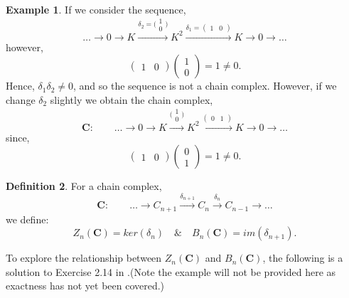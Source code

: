 \documentclass[11.5pt, twoside, a4paper, titlepage]{report}
\providecommand{\equ}[0]{\begin{equation*}}
\providecommand{\eequ}[0] {\end{equation*}}
\theoremstyle{definition}
\newtheorem{mydef}{Definition}[section]
\newtheorem{eg}[mydef]{Example}
\theoremstyle{plain}
\begin{document}
\begin{eg} \label{Kchaineg}
If we consider the sequence, 
\equ 
\dots \xrightarrow{} 0 \xrightarrow{} K \xrightarrow{\delta_2=\big(\begin{smallmatrix} 1\\ 0 \end{smallmatrix}\big)} K^2 \xrightarrow{\delta_1=(\begin{smallmatrix}1 & 0 \end{smallmatrix})} K \xrightarrow{} 0 \xrightarrow{} \dots
\eequ
however,
\equ
\begin{pmatrix}
1 & 0
\end{pmatrix}
\begin{pmatrix*}
1\\
0
\end{pmatrix*}
= 1 \neq 0.
\eequ
Hence, $\delta_1\delta_2 \neq0$, and so the sequence is not a chain complex. However, if we change $\delta_2$ slightly we obtain the chain complex,
\equ
\mathbf{C}: \qquad \dots \xrightarrow{} 0 \xrightarrow{} K \xrightarrow{\big(\begin{smallmatrix} 1\\ 0 \end{smallmatrix}\big)} K^2 \xrightarrow{(\begin{smallmatrix}0 & 1 \end{smallmatrix})} K \xrightarrow{} 0 \xrightarrow{} \dots
\eequ
since, 
\equ
\begin{pmatrix}
1 & 0
\end{pmatrix}
\begin{pmatrix*}
0\\
1
\end{pmatrix*}
= 1 \neq 0.
\eequ
\end{eg}

\begin{mydef}
For a chain complex,
\begin{equation*}
\mathbf{C}: \qquad \dots \xrightarrow{} C_{n+1} \xrightarrow{\delta_{n+1 }} C_{n} \xrightarrow{\delta_{n}} C_{n-1} \xrightarrow{} \dots
\end{equation*}
we define:
\begin{equation*}
Z_n(\mathbf{C})=ker(\delta_n) \quad \& \quad B_n(\mathbf{C})=im(\delta_{n+1}).
\end{equation*}
\end{mydef}

To explore the relationship between $Z_n(\mathbf{C})$ and $B_n(\mathbf{C})$, the following is a solution to Exercise 2.14 in \cite{Rotman}.(Note the example will not be provided here as exactness has not yet been covered.)
\end{document}
